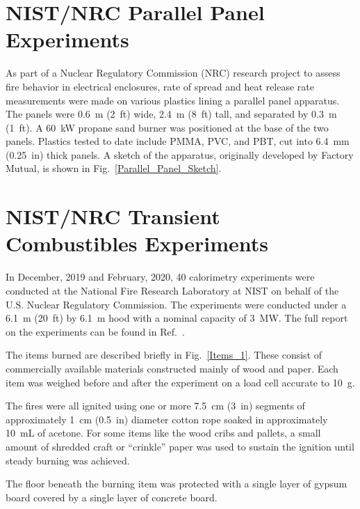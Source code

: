 \FloatBarrier

\section{NIST/NRC Parallel Panel Experiments}
\label{NIST_NRC_Parallel_Panels_Description}

As part of a Nuclear Regulatory Commission (NRC) research project to assess fire behavior in electrical enclosures, rate of spread and heat release rate measurements were made on various plastics lining a parallel panel apparatus. The panels were 0.6~m (2~ft) wide, 2.4~m (8~ft) tall, and separated by 0.3~m (1~ft). A 60~kW propane sand burner was positioned at the base of the two panels. Plastics tested to date include PMMA, PVC, and PBT, cut into 6.4~mm (0.25~in) thick panels. A sketch of the apparatus, originally developed by Factory Mutual, is shown in Fig.~\ref{Parallel_Panel_Sketch}.


\section{NIST/NRC Transient Combustibles Experiments}
\label{NIST_NRC_Transient_Combustibles_Description}

In December, 2019 and February, 2020, 40 calorimetry experiments were conducted at the National Fire Research Laboratory at NIST on behalf of the U.S. Nuclear Regulatory Commission. The experiments were conducted under a 6.1~m (20~ft) by 6.1~m hood with a nominal capacity of 3~MW. The full report on the experiments can be found in Ref.~\cite{McGrattan:Multiple_Transients_2020}.

The items burned are described briefly in Fig.~\ref{Items_1}. These consist of commercially available materials constructed mainly of wood and paper. Each item was weighed before and after the experiment on a load cell accurate to 10~g.

The fires were all ignited using one or more 7.5~cm (3~in) segments of approximately 1~cm (0.5~in) diameter cotton rope soaked in approximately 10~mL of acetone. For some items like the wood cribs and pallets, a small amount of shredded craft or ``crinkle'' paper was used to sustain the ignition until steady burning was achieved.

The floor beneath the burning item was protected with a single layer of gypsum board covered by a single layer of concrete board.


